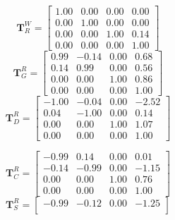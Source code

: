 \documentclass[12pt,a4paper]{article}
\newcommand{\mat}[1]{\mathbf{#1}}
\begin{document}
\setlength{\arraycolsep}{4pt}
\noindent
\begin{tcolorbox}[enhanced,attach boxed title to top center={yshift=-3mm,yshifttext=-1mm}, colback=blue!5!white, colframe=blue!75!black, colbacktitle=blue!40!white, title=Homogeneous transforms for robot initial pose,fonttitle=\bfseries, boxed title style={size=small,colframe=blue!50!black} ]
  \label{tab:q3}
    \begin{minipage}[t]{0.49\linewidth}
    \small
    \[
    \mat{T}^{W}_{R} =
    \begin{bmatrix}
     1.00 & 0.00 & 0.00 & 0.00 \\
     0.00 & 1.00 & 0.00 & 0.00 \\
     0.00 &  0.00 & 1.00 & 0.14 \\
     0.00 &  0.00 & 0.00 & 1.00
    \end{bmatrix}
    \]
    \vspace{8pt}
    \[
    \mat{T}^{R}_{G} =
    \begin{bmatrix}
     0.99 & -0.14 &  0.00 &  0.68 \\
     0.14 &  0.99 &  0.00 &  0.56 \\
     0.00 &  0.00 &  1.00 &  0.86 \\
     0.00 &  0.00 &  0.00 &  1.00
    \end{bmatrix}
    \]
    \vspace{8pt}
    \[
    \mat{T}^{R}_{D} =
    \begin{bmatrix}
     -1.00 & -0.04 &  0.00 & -2.52 \\
      0.04 & -1.00 &  0.00 &  0.14 \\
      0.00 &  0.00 &  1.00 &  1.07 \\
      0.00 &  0.00 &  0.00 &  1.00
    \end{bmatrix}
    \]
    \end{minipage}\hfill
    \begin{minipage}[t]{0.49\linewidth}
    \small
    \[
    \mat{T}^{R}_{C} =
    \begin{bmatrix}
     -0.99 &  0.14 &  0.00 &  0.01 \\
     -0.14 & -0.99 &  0.00 & -1.15 \\
      0.00 &  0.00 &  1.00 &  0.76 \\
      0.00 &  0.00 &  0.00 &  1.00
    \end{bmatrix}
    \]
    \vspace{8pt}
    \[
    \mat{T}^{R}_{S} =
    \begin{bmatrix}
     -0.99 & -0.12 &  0.00 & -1.25 \\

\end{bmatrix}\]
\end{minipage}
\end{tcolorbox}
\end{document}

